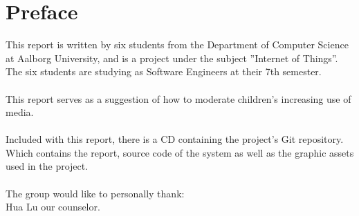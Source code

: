 \chapter*{Preface}
\label{chap:preface}
This report is written by six students from the Department of Computer Science at Aalborg University, and is a project under the subject ''Internet of Things''. The six students are studying as Software Engineers at their 7th semester.\\
\\
This report serves as a suggestion of how to moderate children's increasing use of media.\\
\\
Included with this report, there is a CD containing the project's Git repository. Which contains the report, source code of the system as well as the graphic assets used in the project.\\
\\
The group would like to personally thank:\\
Hua Lu our counselor.
